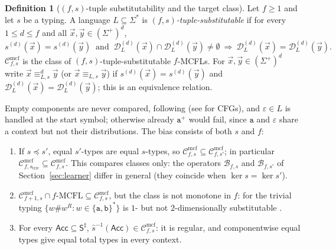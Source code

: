 \documentclass[11pt]{article}
\numberwithin{equation}{section}
\theoremstyle{plain}
\theoremstyle{definition}
\newtheorem{definition}[theorem]{Definition}
\theoremstyle{remark}
\newcommand{\Cmcf}[2]{\mathcal{C}^{\mathrm{mcf}}_{#1,#2}}
\newcommand{\D}{\mathcal{D}}
\newcommand{\tuple}[1]{\vec{#1}}
\newcommand{\eps}{\varepsilon}
\theoremstyle{plain}
\begin{document}
\begin{definition}[$(f,s)$-tuple substitutability and the target class]
\label{def:tuple-substitutable}
\label{def:class-cmcf}
Let $f\ge1$ and let $s$ be a typing.  A language $L\subseteq\Sigma^*$ is
\emph{$(f,s)$-tuple-substitutable} if for every $1\le d\le f$ and all
$\tuple x,\tuple y\in(\Sigma^+)^d$,
\[
 s^{(d)}(\tuple x)=s^{(d)}(\tuple y)\ \text{ and }\
 \D_L^{(d)}(\tuple x)\cap\D_L^{(d)}(\tuple y)\ne\emptyset
 \ \Longrightarrow\
 \D_L^{(d)}(\tuple x)=\D_L^{(d)}(\tuple y).
\]
$\Cmcf{f}{s}$ is the class of $(f,s)$-tuple-substitutable $f$-MCFLs.  For
$\tuple x,\tuple y\in(\Sigma^+)^d$ write $\tuple x\equiv_{L,s}^d\tuple y$ (or
$\tuple x\equiv_{L,s}\tuple y$) if $s^{(d)}(\tuple x)=s^{(d)}(\tuple y)$ and
$\D_L^{(d)}(\tuple x)=\D_L^{(d)}(\tuple y)$; this is an equivalence relation.
\end{definition}

Empty components are never compared, following
\cite[Section~3.1 and footnote~3]{Yoshinaka2011} (see \cite{Clark2013} for
CFGs), and $\eps\in L$ is handled at the start symbol; otherwise already
$\mathtt a^+$ would fail, since $\mathtt a$ and $\eps$ share a context but not
their distributions.  The bias consists of both $s$ and $f$:
\begin{enumerate}[label=\textup{(\alph*)},leftmargin=*]
\item If $s\preceq s'$, equal $s'$-types are equal $s$-types, so
$\Cmcf{f}{s}\subseteq\Cmcf{f}{s'}$; in particular
$\Cmcf{f}{s_{\mathrm{triv}}}\subseteq\Cmcf{f}{s}$.  This compares classes
only: the operators $\mathcal B_{f,s}$ and $\mathcal B_{f,s'}$ of
Section~\ref{sec:learner} differ in general (they coincide when
$\ker s=\ker s'$).
\item $\Cmcf{f+1}{s}\cap f\text{-}\mathrm{MCFL}\subseteq\Cmcf{f}{s}$, but the
class is not monotone in $f$: for the trivial typing
$\{w\mathtt{\#}w^R:w\in\{\mathtt a,\mathtt b\}^*\}$ is
$1$- but not $2$-dimensionally substitutable
\cite[Section~3.1, Example~5]{Yoshinaka2011}.
\item For every $\mathsf{Acc}\subseteq\mathsf S^\sharp$,
$\widehat{s}^{-1}(\mathsf{Acc})\in\Cmcf{f}{s}$: it is regular, and
componentwise equal types give equal total types in every context.
\end{enumerate}
\end{document}
